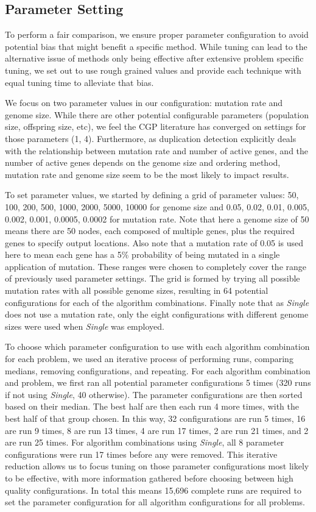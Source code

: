 \documentclass[journal]{IEEEtran}
\begin{document}
\subsection{Parameter Setting}
\label{sec:parameter}
To perform a fair comparison, we ensure proper parameter configuration
to avoid potential bias that might benefit
a specific method.  While tuning can lead to the alternative issue
of methods only being effective after extensive problem specific tuning, we set out to use
rough grained values and provide each technique with equal tuning time to alleviate that bias.

We focus on two parameter values in our configuration: mutation rate and genome size.
While there are other potential configurable parameters (population size, offspring size, etc),
we feel the CGP literature has converged on settings for those parameters (1, 4).
Furthermore, as duplication detection explicitly deals with the relationship between
mutation rate and number of active genes, and the number of active genes depends
on the genome size and ordering method, mutation rate and genome size seem to be
the most likely to impact results.

To set parameter values, we started by defining a grid of parameter values:
50, 100, 200, 500, 1000, 2000, 5000, 10000 for genome size and 0.05, 0.02, 0.01,
0.005, 0.002, 0.001, 0.0005, 0.0002 for mutation rate.  Note that here a genome
size of 50 means there are 50 nodes, each composed of multiple genes, plus the
required genes to specify output locations.  Also note that a mutation rate of 0.05
is used here to mean each gene has a 5\% probability of being mutated in a single
application of mutation.  These ranges were chosen to completely cover the
range of previously used parameter settings.
The grid is formed by trying all possible mutation rates
with all possible genome sizes, resulting in 64 potential configurations for each
of the algorithm combinations.  Finally note that as \emph{Single} does not
use a mutation rate, only the eight configurations with different genome sizes were
used when \emph{Single} was employed.

To choose which parameter configuration to use with each algorithm combination
for each problem, we used an iterative process of performing runs, comparing medians, removing configurations,
and repeating.  For each algorithm combination and problem, we first ran all
potential parameter configurations 5 times (320 runs if not using \emph{Single}, 40 otherwise).
The parameter configurations are then sorted based on their median.  The best half are then
each run 4 more times, with the best half of that group chosen.  In this way, 32 configurations
are run 5 times, 16 are run 9 times, 8 are run 13 times, 4 are run 17 times, 2 are run 21 times,
and 2 are run 25 times.  For algorithm combinations using \emph{Single}, all 8 parameter configurations were run 17 times
before any were removed.  This iterative reduction allows us to focus tuning on
those parameter configurations most likely to be effective, with more information
gathered before choosing between high quality configurations.  In total this means
15,696 complete runs are required to set the parameter configuration for all
algorithm configurations for all problems.
\end{document}
